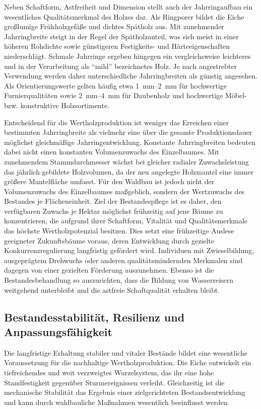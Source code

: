 \documentclass[twocolumn, bibliography=totoc, abstract=true]{scrartcl}
\begin{document}
Neben Schaftform, Astfreiheit und Dimension stellt auch der Jahrringaufbau ein wesentliches Qualitätsmerkmal des Holzes dar. Als Ringporer bildet die Eiche großlumige Frühholzgefäße und dichtes Spätholz aus. Mit zunehmender Jahrringbreite steigt in der Regel der Spätholzanteil, was sich meist in einer höheren Rohdichte sowie günstigeren Festigkeits- und Härteeigenschaften niederschlägt. Schmale Jahrringe ergeben hingegen ein vergleichsweise leichteres und in der Verarbeitung als \enquote{mild} bezeichnetes Holz. Je nach angestrebter Verwendung werden daher unterschiedliche Jahrringbreiten als günstig angesehen. Als Orientierungswerte gelten häufig etwa \qtyrange{1}{2}{\mm} für hochwertige Furnierqualitäten sowie \qtyrange{2}{4}{\mm} für Daubenholz und hochwertige Möbel- bzw. konstruktive Holzsortimente.

Entscheidend für die Wertholzproduktion ist weniger das Erreichen einer bestimmten Jahrringbreite als vielmehr eine über die gesamte Produktionsdauer möglichst gleichmäßige Jahrringentwicklung. Konstante Jahrringbreiten bedeuten dabei nicht einen konstanten Volumenzuwachs des Einzelbaumes. Mit zunehmendem Stammdurchmesser wächst bei gleicher radialer Zuwachsleistung das jährlich gebildete Holzvolumen, da der neu angelegte Holzmantel eine immer größere Mantelfläche umfasst. Für den Waldbau ist jedoch nicht der Volumenzuwachs des Einzelbaumes maßgeblich, sondern der Wertzuwachs des Bestandes je Flächeneinheit. Ziel der Bestandespflege ist es daher, den verfügbaren Zuwachs je Hektar möglichst frühzeitig auf jene Bäume zu konzentrieren, die aufgrund ihrer Schaftform, Vitalität und Qualitätsmerkmale das höchste Wertholzpotenzial besitzen. Dies setzt eine frühzeitige Auslese geeigneter Zukunftsbäume voraus, deren Entwicklung durch gezielte Konkurrenzregulierung langfristig gefördert wird. Individuen mit Zwieselbildung, ausgeprägtem Drehwuchs oder anderen qualitätsmindernden Merkmalen sind dagegen von einer gezielten Förderung auszunehmen. Ebenso ist die Bestandesbehandlung so auszurichten, dass die Bildung von Wasserreisern weitgehend unterbleibt und die astfreie Schaftqualität erhalten bleibt.

\subsection{Bestandesstabilität, Resilienz und Anpassungsfähigkeit}

Die langfristige Erhaltung stabiler und vitaler Bestände bildet eine wesentliche Voraussetzung für die nachhaltige Wertholzproduktion. Die Eiche entwickelt ein tiefreichendes und weit verzweigtes Wurzelsystem, das ihr eine hohe Standfestigkeit gegenüber Sturmereignissen verleiht. Gleichzeitig ist die mechanische Stabilität das Ergebnis einer zielgerichteten Bestandsentwicklung und kann durch waldbauliche Maßnahmen wesentlich beeinflusst werden.
\end{document}
